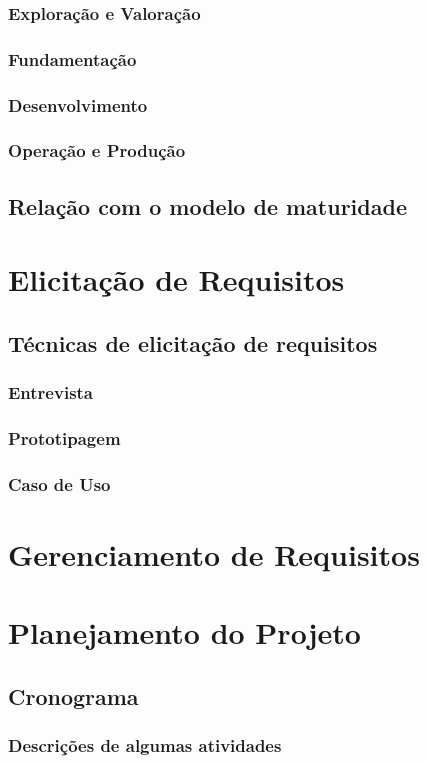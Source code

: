     \subsubsection{Exploração e Valoração}
    \subsubsection{Fundamentação}
    \subsubsection{Desenvolvimento}
    \subsubsection{Operação e Produção}
  \subsection{Relação com o modelo de maturidade}

\newpage

\section{Elicitação de Requisitos}\label{elic}
  
  \subsection{Técnicas de elicitação de requisitos}
    \subsubsection{Entrevista}
    \subsubsection{Prototipagem}
    \subsubsection{Caso de Uso}

\newpage

\section{Gerenciamento de Requisitos}\label{geren}

\newpage

\section{Planejamento do Projeto}\label{plan}

  \subsection{Cronograma}
  \subsubsection{Descrições de algumas atividades}